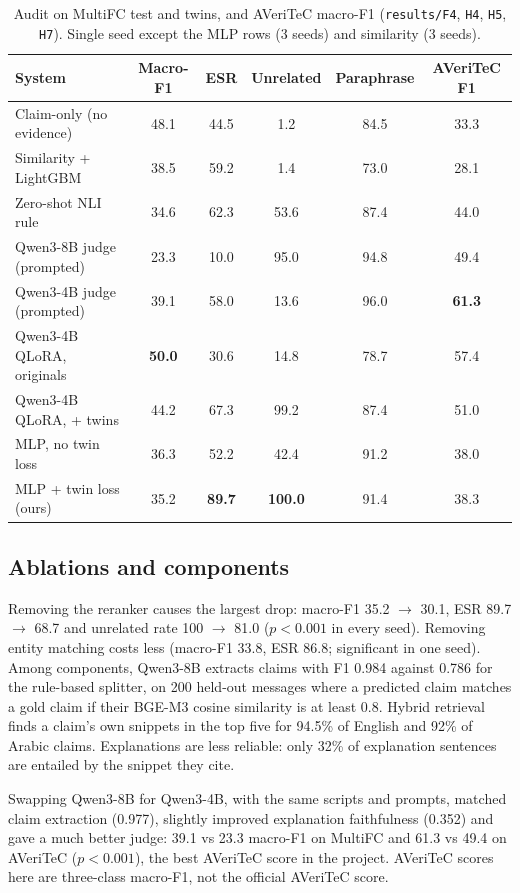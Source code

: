 \documentclass[11pt,a4paper]{article}
\begin{document}
\begin{table}[t]
\centering\small
\caption{Audit on MultiFC test and twins, and AVeriTeC macro-F1 (\texttt{results/F4}, \texttt{H4}, \texttt{H5}, \texttt{H7}). Single seed except the MLP rows (3 seeds) and similarity (3 seeds).}
\label{tab:audit}
\begin{tabular}{@{}lccccc@{}}
\toprule
System & Macro-F1 & ESR & Unrelated & Paraphrase & AVeriTeC F1 \\
\midrule
Claim-only (no evidence) & 48.1 & 44.5 & 1.2 & 84.5 & 33.3 \\
Similarity + LightGBM & 38.5 & 59.2 & 1.4 & 73.0 & 28.1 \\
Zero-shot NLI rule & 34.6 & 62.3 & 53.6 & 87.4 & 44.0 \\
Qwen3-8B judge (prompted) & 23.3 & 10.0 & 95.0 & 94.8 & 49.4 \\
Qwen3-4B judge (prompted) & 39.1 & 58.0 & 13.6 & 96.0 & \textbf{61.3} \\
Qwen3-4B QLoRA, originals & \textbf{50.0} & 30.6 & 14.8 & 78.7 & 57.4 \\
Qwen3-4B QLoRA, + twins & 44.2 & 67.3 & 99.2 & 87.4 & 51.0 \\
MLP, no twin loss & 36.3 & 52.2 & 42.4 & 91.2 & 38.0 \\
MLP + twin loss (ours) & 35.2 & \textbf{89.7} & \textbf{100.0} & 91.4 & 38.3 \\
\bottomrule
\end{tabular}
\end{table}

\subsection{Ablations and components}
Removing the reranker causes the largest drop: macro-F1 35.2 $\rightarrow$ 30.1, ESR 89.7 $\rightarrow$ 68.7 and unrelated rate 100 $\rightarrow$ 81.0 ($p<0.001$ in every seed). Removing entity matching costs less (macro-F1 33.8, ESR 86.8; significant in one seed). Among components, Qwen3-8B extracts claims with F1 0.984 against 0.786 for the rule-based splitter, on 200 held-out messages where a predicted claim matches a gold claim if their BGE-M3 cosine similarity is at least 0.8. Hybrid retrieval finds a claim's own snippets in the top five for 94.5\% of English and 92\% of Arabic claims. Explanations are less reliable: only 32\% of explanation sentences are entailed by the snippet they cite.

Swapping Qwen3-8B for Qwen3-4B, with the same scripts and prompts, matched claim extraction (0.977), slightly improved explanation faithfulness (0.352) and gave a much better judge: 39.1 vs 23.3 macro-F1 on MultiFC and 61.3 vs 49.4 on AVeriTeC ($p<0.001$), the best AVeriTeC score in the project. AVeriTeC scores here are three-class macro-F1, not the official AVeriTeC score.
\end{document}
